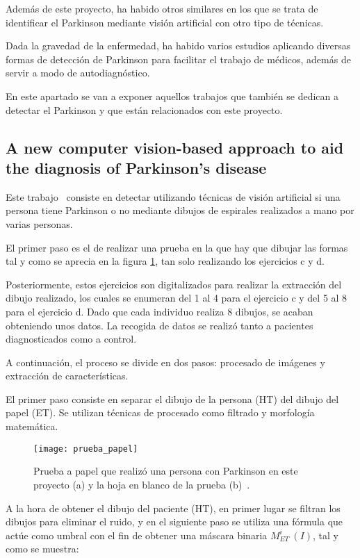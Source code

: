 Además de este proyecto, ha habido otros similares en los que se trata de identificar el Parkinson mediante visión artificial con otro tipo de técnicas.

Dada la gravedad de la enfermedad, ha habido varios estudios aplicando diversas formas de detección de Parkinson para facilitar el trabajo de médicos, además de servir a modo de autodiagnóstico.

En este apartado se van a exponer aquellos trabajos que también se dedican a detectar el Parkinson y que están relacionados con este proyecto.

\subsection{A new computer vision-based approach to aid the diagnosis of Parkinson's disease}
Este trabajo~\cite{pereira2016new} consiste en detectar utilizando técnicas de visión artificial si una persona tiene Parkinson o no mediante dibujos de espirales realizados a mano por varias personas.

El primer paso es el de realizar una prueba en la que hay que dibujar las formas tal y como se aprecia en la figura \ref{fig:pruebapapel}, tan solo realizando los ejercicios c y d.

Posteriormente, estos ejercicios son digitalizados para realizar la extracción del dibujo realizado, los cuales se enumeran del 1 al 4 para el ejercicio c y del 5 al 8 para el ejercicio d. Dado que cada individuo realiza 8 dibujos, se acaban obteniendo unos datos. La recogida de datos se realizó tanto a pacientes diagnosticados como a control.

A continuación, el proceso se divide en dos pasos: procesado de imágenes y extracción de características.

El primer paso consiste en separar el dibujo de la persona (HT) del dibujo del papel (ET). Se utilizan técnicas de procesado como filtrado y morfología matemática.

\begin{figure}[ht]
	\texttt{[image: prueba\_papel]}
	\caption[Prueba a papel que realizó una persona con Parkinson en este proyecto y la hoja en blanco de la prueba.]{Prueba a papel que realizó una persona con Parkinson en este proyecto (a) y la hoja en blanco de la prueba (b)~\cite{pereira2016new}.}
	\label{fig:pruebapapel}
\end{figure}

A la hora de obtener el dibujo del paciente (HT), en primer lugar se filtran los dibujos para eliminar el ruido, y en el siguiente paso se utiliza una fórmula que actúe como umbral con el fin de obtener una máscara binaria \(M^{i}_{ET}\ (I)\), tal y como se muestra: 

